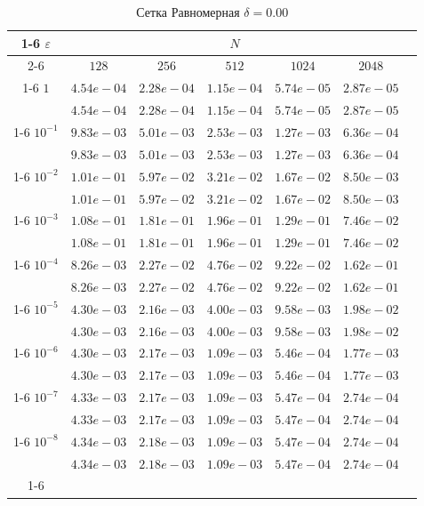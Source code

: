 \documentclass[10pt,twoside]{article}
\begin{document}
\begin{table} [!htb]
    \caption {Сетка Равномерная $\delta = 0.00$}
        \begin{center}
\begin{tabular}{|c|c|c|c|c|c|c}
\cline{1-6} $\varepsilon$ & \multicolumn{5}{c|}{$N$} \\
\cline{2-6} &$128$ & $256$ & $512$  & $1024$& $2048$\\

\cline{1-6}
$1$
&$4.54e-04$&$2.28e-04$&$1.15e-04$&$5.74e-05$&$2.87e-05$\\
&$4.54e-04$&$2.28e-04$&$1.15e-04$&$5.74e-05$&$2.87e-05$\\
\cline{1-6}
$10^{-1}$
&$9.83e-03$&$5.01e-03$&$2.53e-03$&$1.27e-03$&$6.36e-04$\\
&$9.83e-03$&$5.01e-03$&$2.53e-03$&$1.27e-03$&$6.36e-04$\\
\cline{1-6}
$10^{-2}$
&$1.01e-01$&$5.97e-02$&$3.21e-02$&$1.67e-02$&$8.50e-03$\\
&$1.01e-01$&$5.97e-02$&$3.21e-02$&$1.67e-02$&$8.50e-03$\\
\cline{1-6}
$10^{-3}$
&$1.08e-01$&$1.81e-01$&$1.96e-01$&$1.29e-01$&$7.46e-02$\\
&$1.08e-01$&$1.81e-01$&$1.96e-01$&$1.29e-01$&$7.46e-02$\\
\cline{1-6}
$10^{-4}$
&$8.26e-03$&$2.27e-02$&$4.76e-02$&$9.22e-02$&$1.62e-01$\\
&$8.26e-03$&$2.27e-02$&$4.76e-02$&$9.22e-02$&$1.62e-01$\\
\cline{1-6}
$10^{-5}$
&$4.30e-03$&$2.16e-03$&$4.00e-03$&$9.58e-03$&$1.98e-02$\\
&$4.30e-03$&$2.16e-03$&$4.00e-03$&$9.58e-03$&$1.98e-02$\\
\cline{1-6}
$10^{-6}$
&$4.30e-03$&$2.17e-03$&$1.09e-03$&$5.46e-04$&$1.77e-03$\\
&$4.30e-03$&$2.17e-03$&$1.09e-03$&$5.46e-04$&$1.77e-03$\\
\cline{1-6}
$10^{-7}$
&$4.33e-03$&$2.17e-03$&$1.09e-03$&$5.47e-04$&$2.74e-04$\\
&$4.33e-03$&$2.17e-03$&$1.09e-03$&$5.47e-04$&$2.74e-04$\\
\cline{1-6}
$10^{-8}$
&$4.34e-03$&$2.18e-03$&$1.09e-03$&$5.47e-04$&$2.74e-04$\\
&$4.34e-03$&$2.18e-03$&$1.09e-03$&$5.47e-04$&$2.74e-04$\\
\cline{1-6}
\cline{1-6}
        \end{tabular}
    \end{center}
\end{table}
\end{document}
